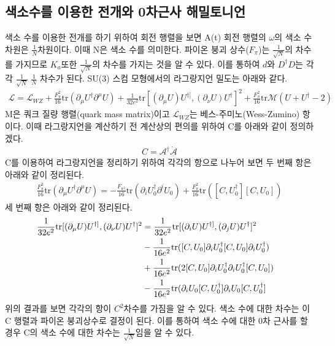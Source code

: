\documentclass[superscriptaddress,
nofootinbib,byrevtex,fleqn,prd,12pt]{revtex4}
\newcommand{\tr}{\mathrm{tr}}
\begin{document}
\subsection{색소수를 이용한 전개와 0차근사 해밀토니언}\label{24}
색소 수를 이용한 전개를 하기 위하여 회전 행렬을 보면 A(t) 회전 행렬의 $\omega$의 색소 수 차원은 $ \frac{1}{N} $차원이다. 이때 N은 색소 수를 의미한다. 파이온 붕괴 상수($F_{\pi}$)는 $\frac{1}{\sqrt{N}}$의 차수를 가지므로 $K_{a}$또한 $\frac{1}{\sqrt{N}}$의 차수를 가지는 것을 알 수 있다. 이를 통하여 $d$와 $D^{\dagger}D$는 각각 $ \frac{1}{\sqrt{N}}$  $\frac{1}{N}$ 차수가 된다.
SU(3) 스컴 모형에서의 라그랑지언 밀도는 아래와 같다.\cite{3}
\begin{align}
  \mathcal{L} = \mathcal{L}_{WZ}+\frac{F_{\pi}^{2}}{16} \tr (\partial_{\mu}U^{\dagger}\partial^{\mu}U)+\frac{1}{32e^{2}} \tr[(\partial_{\mu}U)U^{\dagger]},(\partial_{\nu}U)U^{\dagger}]^{2}
  +\frac{F_{\pi}^{2}}{16} \tr\mathcal{M}(U+U^{\dagger}-2)\label{eq:lagrangian}
\end{align}
M은 쿼크 질량 행렬(quark mass matrix)이고 $ \mathcal{L}_{WZ}$는 베스-주미노(Wess-Zumino) 항이다. 이때 라그랑지언을 계산하기 전 계산상의 편의를 위하여 C를 아래와 같이 정의하겠다.
\begin{align}
  C= \mathcal{A}^{\dagger} \dot{\mathcal{A}}
  \label{eq:Cmatrix}
\end{align}
C를 이용하여 라그랑지언을 정리하기 위하여 각각의 항으로 나누어 보면 두 번째 항은 아래와 같이 정리된다.
\begin{align}
  \frac{F_{\pi}^{2}}{16} \tr (\partial_{\mu}U^{\dagger} \partial^{\mu}U) = - \frac{F_{\pi^{2}}}{16} \tr(\partial_{i}U_{0}^{\dagger}\partial^{i}U_{0})+\frac{F_{\pi}^{2}}{16}
   \tr([C,U_{0}^{\dagger}][C,U_{0}])\label{eq:secondterm}
\end{align}
세 번째 항은 아래와 같이 정리된다.
\begin{align}
  \frac{1}{32e^{2}} \tr[(\partial_{\mu}U)U^{\dagger]},(\partial_{\nu}U)U^{\dagger}]^{2} &= \frac{1}{32e^{2}} \tr[(\partial_{i}U)U^{\dagger]},(\partial_{j}U)U^{\dagger}]^{2} \cr
  &-\frac{1}{16e^{2}} \tr([C,U_{0}]\partial_{i}U_{0}^{\dagger}[C,U_{0}]\partial_{i}U_{0}^{\dagger}) \cr
  &+ \frac{1}{16e^{2}} \tr(2[C,U_{0}]\partial_{i}U_{0}^{\dagger}\partial_{i}U_{0}^{\dagger}[C,U_{0}]) \cr
  &- \frac{1}{16e^{2}} \tr(\partial_{i}U_{0}[C,U_{0}^{\dagger}]\partial_{i}U_{0}[C,U_{0}^{\dagger}]\label{eq:thirdterm}
\end{align}
위의 결과를 보면 각각의 항이 $ C^{2}$차수를 가짐을 알 수 있다. 색소 수에 대한 차수는 이 C 행렬과 파이온 붕괴상수로 결정이 된다. 이를 통하여 색소 수에 대한 0차 근사를 할 경우 C의 색소 수에 대한 차수는 $\frac{1}{\sqrt{N}}$임을 알 수 있다.
\end{document}
